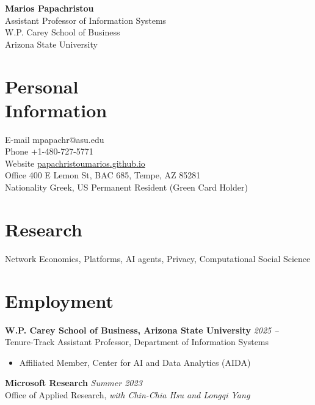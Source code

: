 \documentclass[margin]{res}
\newcommand{\field}[2]{\noindent \textbf{#1} \hfill #2 \\}
\begin{document}
\begin{center}
{\Large \textbf{Marios Papachristou}} \\ Assistant Professor of Information Systems \\ W.P. Carey School of Business \\ Arizona State University
\end{center}
\vspace{-1em}

\begin{resume}

\section{Personal \\ Information} 
E-mail \hfill mpapachr@asu.edu\\
Phone \hfill +1-480-727-5771 \\
Website \hfill \href{https://papachristoumarios.github.io}{{papachristoumarios.github.io}} \\
Office \hfill 400 E Lemon St, BAC 685, Tempe, AZ 85281 \\
Nationality \hfill Greek, US Permanent Resident (Green Card Holder)
  

\section{Research} Network Economics, Platforms, AI agents, Privacy, Computational Social Science


\section{Employment}

\field{W.P. Carey School of Business, Arizona State University}{\emph{2025 --}}{Tenure-Track Assistant Professor, Department of Information Systems} 

\begin{itemize}[nosep]
	\item Affiliated Member, Center for AI and Data Analytics (AIDA)	
\end{itemize}


\field{Microsoft Research}{\emph{Summer 2023}}{Office of Applied Research, \emph{with Chin-Chia Hsu and Longqi Yang}}


\end{resume}
\end{document}
